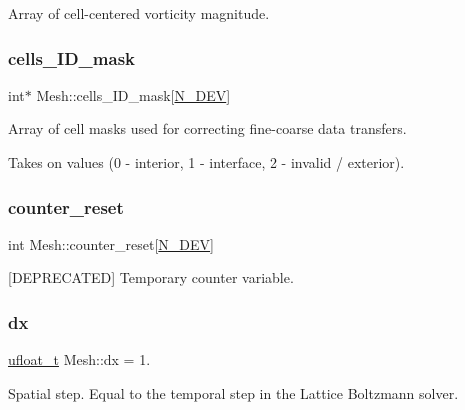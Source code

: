 Array of cell-\/centered vorticity magnitude. 

\mbox{\label{classMesh_a1bfac9e480361bfdd0daf46ad6e8ca79}} 
\subsubsection{\texorpdfstring{cells\+\_\+\+I\+D\+\_\+mask}{cells\_ID\_mask}}
{\footnotesize\ttfamily int$\ast$ Mesh\+::cells\+\_\+\+I\+D\+\_\+mask\mbox{[}\hyperlink{cppspec_8h_a2b674dab7a14f1bf32b48b7fda5022dc}{N\+\_\+\+D\+EV}\mbox{]}}



Array of cell masks used for correcting fine-\/coarse data transfers. 

Takes on values (0 -\/ interior, 1 -\/ interface, 2 -\/ invalid / exterior). \mbox{\label{classMesh_a41a24fd7347d4d39f64ce54c65c7dcd5}} 
\subsubsection{\texorpdfstring{counter\+\_\+reset}{counter\_reset}}
{\footnotesize\ttfamily int Mesh\+::counter\+\_\+reset\mbox{[}\hyperlink{cppspec_8h_a2b674dab7a14f1bf32b48b7fda5022dc}{N\+\_\+\+D\+EV}\mbox{]}}



\mbox{[}D\+E\+P\+R\+E\+C\+A\+T\+ED\mbox{]} Temporary counter variable. 

\mbox{\label{classMesh_a0886636d94a77389efde5dc9710e19d4}} 
\subsubsection{\texorpdfstring{dx}{dx}}
{\footnotesize\ttfamily \hyperlink{cppspec_8h_af529d360dfac9b9578aa719418a53a21}{ufloat\+\_\+t} Mesh\+::dx = 1.}



Spatial step. Equal to the temporal step in the Lattice Boltzmann solver. 

\mbox{\label{classMesh_af2e2e3a1fab934787d6cf0c8330d933e}} 
